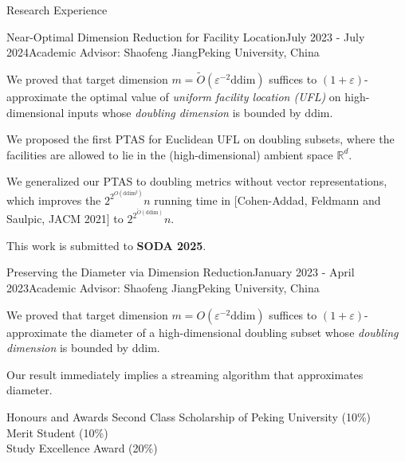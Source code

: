 \documentclass{resume} %
\begin{document}
\begin{rSection}{Research Experience}{}
    \begin{rSubsection}{Near-Optimal Dimension Reduction for Facility Location}{July 2023 - July 2024}{Academic Advisor: Shaofeng Jiang}{Peking University, China}
       \item We proved that target dimension $m = \tilde{O}(\varepsilon^{-2} \mathrm{ddim})$ suffices to $(1+\varepsilon)$-approximate the optimal value of \emph{uniform facility location (UFL)} on high-dimensional inputs whose \emph{doubling dimension} is bounded by $\mathrm{ddim}$.
       \item We proposed the first PTAS for Euclidean UFL on doubling subsets, where the facilities are allowed to lie in the (high-dimensional) ambient space $\mathbb{R}^d$.
       \item We generalized our PTAS to doubling metrics without vector representations, which improves the $2^{2^{O(\mathrm{ddim^2})}} n$ running time in [Cohen-Addad, Feldmann and Saulpic, JACM 2021] to $2^{2^{\tilde O(\mathrm{ddim})}} n$.
       \item This work is submitted to {\bf SODA 2025}.
    \end{rSubsection}

    \begin{rSubsection}{Preserving the Diameter via Dimension Reduction}{January 2023 - April 2023}{Academic Advisor: Shaofeng Jiang}{Peking University, China}
        \item We proved that target dimension $m = O(\varepsilon^{-2} \mathrm{ddim})$ suffices to $(1+\varepsilon)$-approximate the diameter of a high-dimensional doubling subset whose \emph{doubling dimension} is bounded by $\mathrm{ddim}$.
        \item Our result immediately implies a streaming algorithm that approximates diameter.
    \end{rSubsection}
\end{rSection}

\begin{rSection}{Honours and Awards}{}
    Second Class Scholarship of Peking University (10\%) 
    \\ Merit Student (10\%) 
    \\ Study Excellence Award (20\%) 
\end{rSection}
\end{document}
